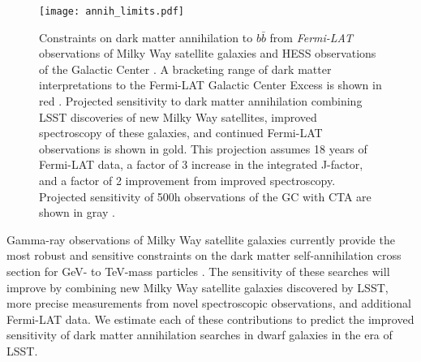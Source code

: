 \begin{figure}[t]
\centering
\texttt{[image: annih\_limits.pdf]}
\caption{Constraints on dark matter annihilation to $b\bar{b}$ from {\it Fermi-LAT} observations of Milky Way satellite galaxies \citep[LAT Dwarfs;][]{Ackermann:2015} and HESS observations of the Galactic Center \citep[HESS GC;][]{1607.08142}. 
A bracketing range of dark matter interpretations to the  Fermi-LAT Galactic Center Excess is shown in red \citep[GCE;][]{1402.6703, Gordon:2013, Abazajian:2014}.
Projected sensitivity to dark matter annihilation combining LSST discoveries of new Milky Way satellites, improved spectroscopy of these galaxies, and continued Fermi-LAT observations is shown in gold. This projection assumes 18 years of Fermi-LAT data, a factor of 3 increase in the integrated J-factor, and a factor of 2 improvement from improved spectroscopy. 
Projected sensitivity of 500h observations of the GC with CTA are shown in gray \citep[CTA GC;][]{Zaharijas:prep}.
\label{fig:indirect}
}
\end{figure}

Gamma-ray observations of Milky Way satellite galaxies currently provide the most robust and sensitive constraints on the dark matter self-annihilation cross section for GeV- to TeV-mass particles \citep[\eg][]{Ackermann:2014, Geringer-Sameth:2015, Ackermann:2015, 1812.06986}.
The sensitivity of these searches will improve by combining new Milky Way satellite galaxies discovered by LSST, more precise \Jfactor measurements from novel spectroscopic observations, and additional Fermi-LAT data. 
We estimate each of these contributions to predict the improved sensitivity of dark matter annihilation searches in dwarf galaxies in the era of LSST.

